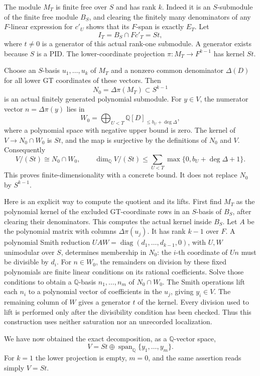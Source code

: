The module $M_T$ is finite free over $S$ and has rank $k$.
Indeed it is an $S$-submodule of the finite free module
$B_S$, and clearing the finitely many denominators of any
$F$-linear expression for $c'_U$ shows that its $F$-span is
exactly $E_T$.  Let
\[
 I_T=B_S\cap F c'_T=S t,
 \tag{N-68}
\]
where $t\ne0$ is a generator of this actual rank-one
submodule.  A generator exists because $S$ is a PID.
The lower-coordinate projection
$\pi:M_T\to F^{k-1}$ has kernel $S t$.

Choose an $S$-basis $u_1,\ldots,u_k$ of $M_T$ and a nonzero
common denominator $\Delta(D)$ for all lower GT coordinates
of these vectors.  Then
\[
 N_0=\Delta\pi(M_T)\subset S^{k-1}
 \tag{N-69}
\]
is an actual finitely generated polynomial submodule.
For $y\in V$, the numerator vector
$n=\Delta\pi(y)$ lies in
\[
 W_0=\bigoplus_{U<T}\mathbb Q[D]_{\le b_U+\deg\Delta},
 \tag{N-70}
\]
where a polynomial space with negative upper bound is zero.
The kernel of $V\to N_0\cap W_0$ is $S t$, and the map is
surjective by the definitions of $N_0$ and $V$.
Consequently
\[
 V/(S t)\cong N_0\cap W_0,
 \qquad
 \dim_{\mathbb Q}V/(S t)
 \le\sum_{U<T}\max\{0,b_U+\deg\Delta+1\}.
 \tag{N-71}
\]
This proves finite-dimensionality with a concrete bound.
It does not replace $N_0$ by $S^{k-1}$.

Here is an explicit way to compute the quotient and its lifts.
First find $M_T$ as the polynomial kernel of the excluded
GT-coordinate rows in an $S$-basis of $B_S$, after clearing
their denominators.  This computes the actual kernel inside
$B_S$.  Let $A$ be the polynomial matrix with columns
$\Delta\pi(u_j)$.  It has rank $k-1$ over $F$.
A polynomial Smith reduction
$U A W=\operatorname{diag}(d_1,\ldots,d_{k-1},0)$, with
$U,W$ unimodular over $S$, determines membership in $N_0$:
the $i$-th coordinate of $Un$ must be divisible by $d_i$.
For $n\in W_0$, the remainders on division by these fixed
polynomials are finite linear conditions on its rational
coefficients.  Solve those conditions to obtain a
$\mathbb Q$-basis $n_1,\ldots,n_m$ of $N_0\cap W_0$.
The Smith operations lift each $n_i$ to a polynomial vector
of coefficients in the $u_j$, giving $y_i\in V$.
The remaining column of $W$ gives a generator $t$ of the
kernel.  Every division used to lift is performed only
after the divisibility condition has been checked.
Thus this construction uses neither saturation nor an
unrecorded localization.

We have now obtained the exact decomposition, as a
$\mathbb Q$-vector space,
\[
                    V=S t\oplus
                          \operatorname{span}_{\mathbb Q}\{y_1,\ldots,y_m\}.
 \tag{N-72}
\]
For $k=1$ the lower projection is empty, $m=0$, and the
same assertion reads simply $V=S t$.

